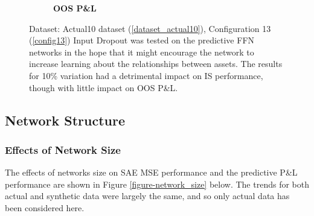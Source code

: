 \documentclass[a4paper,11pt,oneside]{article}
\theoremstyle{plain}
\theoremstyle{definition}
\begin{document}
\begin{figure}[H]
\begin{subfigure}{.5\textwidth}
			\caption{\textbf{OOS P\&L} }
			\label{figure-oos_actual_pl_masking}
		\end{subfigure}
		\caption[Effects of Dropout on P\&L]{Dataset: Actual10 dataset (\ref{dataset_actual10}), Configuration 13 (\ref{config13})
			\newline Input Dropout was tested on the predictive FFN networks in the hope that it might encourage the network to increase learning about the relationships between assets. The results for 10\% variation had a detrimental impact on IS performance, though with little impact on OOS P\&L.}
		\label{figure-actual_pl_masking}
	\end{figure}
		
	\newpage

	\subsection{Network Structure}\label{results_network}
	
	\subsubsection{Effects of Network Size}
	
	The effects of networks size on SAE MSE performance and the predictive P\&L performance are shown in Figure \ref{figure-network_size} below. The trends for both actual and synthetic data were largely the same, and so only actual data has been considered here.
	
\end{document}
